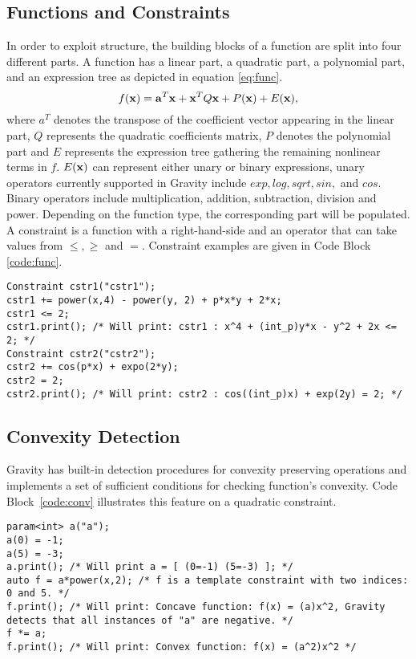 \documentclass{article}
\def\vec#1{\ensuremath{\mathchoice
{\mbox{\boldmath$\displaystyle\mathbf{#1}$}}
{\mbox{\boldmath$\textstyle\mathbf{#1}$}}
{\mbox{\boldmath$\scriptstyle\mathbf{#1}$}}
{\mbox{\boldmath$\scriptscriptstyle\mathbf{#1}$}}}}
\newcommand{\Gravity}{{\sc Gravity}}
\begin{document}
\subsection{Functions and Constraints}
In order to exploit structure, the building blocks of a function are split into four different parts.
A function has a linear part, a quadratic part, a polynomial part, and an expression tree as depicted in equation \ref{eq:func}. 
\begin{equation}
\label{eq:func}
f(\vec x) = \vec a^T \vec x + \vec x^TQ\vec x + P(\vec x) + E(\vec x),
\end{equation}
where $a^T$ denotes the transpose of the coefficient vector appearing in the linear part, $Q$ represents the quadratic coefficients matrix, $P$ denotes the polynomial part and $E$ represents the expression tree gathering the remaining nonlinear terms in $f$. $E(\vec x)$ can represent either unary or binary expressions, unary operators currently supported in \Gravity{} include $exp, log, sqrt, sin,$ and $cos$. Binary operators include multiplication, addition, subtraction, division and power.
Depending on the function type, the corresponding part will be populated.
A constraint is a function with a right-hand-side and an operator that can take values from $\le, \ge$ and $=$. 
Constraint examples are given in Code Block \ref{code:func}.
\begin{code}[h!]
\caption{Declaring Constraints in \Gravity{}}
\begin{verbatim}
Constraint cstr1("cstr1");
cstr1 += power(x,4) - power(y, 2) + p*x*y + 2*x;
cstr1 <= 2;
cstr1.print(); /* Will print: cstr1 : x^4 + (int_p)y*x - y^2 + 2x <= 2; */
Constraint cstr2("cstr2");
cstr2 += cos(p*x) + expo(2*y);
cstr2 = 2; 
cstr2.print(); /* Will print: cstr2 : cos((int_p)x) + exp(2y) = 2; */
\end{verbatim}
\label{code:func}
\end{code}
\subsection{Convexity Detection}
\Gravity{} has built-in detection procedures for convexity preserving operations and implements a set of sufficient conditions for checking function's convexity.
Code Block~\ref{code:conv} illustrates this feature on a quadratic constraint.
\begin{code}[h!]
\caption{Convexity Detection}
\begin{verbatim}
param<int> a("a");
a(0) = -1;
a(5) = -3;
a.print(); /* Will print a = [ (0=-1) (5=-3) ]; */
auto f = a*power(x,2); /* f is a template constraint with two indices:
0 and 5. */
f.print(); /* Will print: Concave function: f(x) = (a)x^2, Gravity
detects that all instances of "a" are negative. */
f *= a;
f.print(); /* Will print: Convex function: f(x) = (a^2)x^2 */
\end{verbatim}
\label{code:conv}
\end{code}
\end{document}
